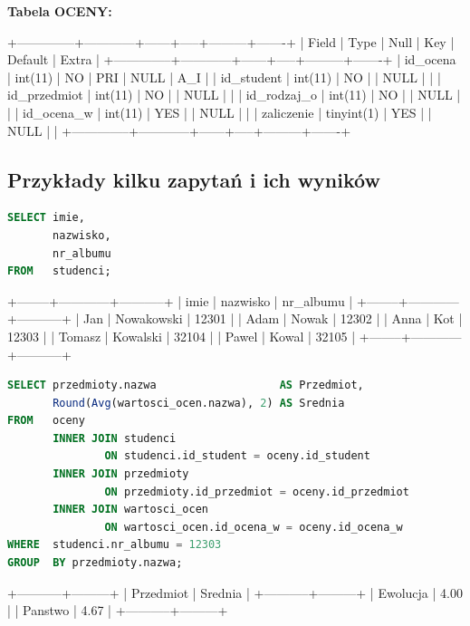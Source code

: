 \documentclass[12pt,a4paper]{article}
\newenvironment{sqltable}%
{\snugshade\verbatim}%
{\endverbatim\endsnugshade}
\begin{document}
\newpage

\textbf{Tabela OCENY:}

\begin{sqltable}
+--------------+------------+------+-----+---------+-------+
| Field        | Type       | Null | Key | Default | Extra |
+--------------+------------+------+-----+---------+-------+
| id_ocena     | int(11)    | NO   | PRI | NULL    |  A_I  |
| id_student   | int(11)    | NO   |     | NULL    |       |
| id_przedmiot | int(11)    | NO   |     | NULL    |       |
| id_rodzaj_o  | int(11)    | NO   |     | NULL    |       |
| id_ocena_w   | int(11)    | YES  |     | NULL    |       |
| zaliczenie   | tinyint(1) | YES  |     | NULL    |       |
+--------------+------------+------+-----+---------+-------+
\end{sqltable}

\subsection{Przykłady kilku zapytań i ich wyników}
\label{sec:ExampleResults}

\begin{lstlisting}[language=SQL]
SELECT imie, 
       nazwisko, 
       nr_albumu 
FROM   studenci; 
\end{lstlisting}
\begin{sqltable}
+--------+------------+-----------+
| imie   | nazwisko   | nr_albumu |
+--------+------------+-----------+
| Jan    | Nowakowski |     12301 |
| Adam   | Nowak      |     12302 |
| Anna   | Kot        |     12303 |
| Tomasz | Kowalski   |     32104 |
| Pawel  | Kowal      |     32105 |
+--------+------------+-----------+
\end{sqltable}

\begin{lstlisting}[language=SQL]
SELECT przedmioty.nazwa                   AS Przedmiot, 
       Round(Avg(wartosci_ocen.nazwa), 2) AS Srednia 
FROM   oceny 
       INNER JOIN studenci 
               ON studenci.id_student = oceny.id_student 
       INNER JOIN przedmioty 
               ON przedmioty.id_przedmiot = oceny.id_przedmiot 
       INNER JOIN wartosci_ocen 
               ON wartosci_ocen.id_ocena_w = oceny.id_ocena_w 
WHERE  studenci.nr_albumu = 12303 
GROUP  BY przedmioty.nazwa; 
\end{lstlisting}
\begin{sqltable}
+-----------+---------+
| Przedmiot | Srednia |
+-----------+---------+
| Ewolucja  |    4.00 |
| Panstwo   |    4.67 |
+-----------+---------+
\end{sqltable}
\end{document}
